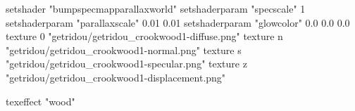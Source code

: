 setshader "bumpspecmapparallaxworld"
setshaderparam "specscale" 1
setshaderparam "parallaxscale" 0.01 0.01
setshaderparam "glowcolor" 0.0 0.0 0.0
texture 0 "getridou/getridou_crookwood1-diffuse.png"
texture n "getridou/getridou_crookwood1-normal.png"
texture s "getridou/getridou_crookwood1-specular.png"
texture z "getridou/getridou_crookwood1-displacement.png"

texeffect "wood"
